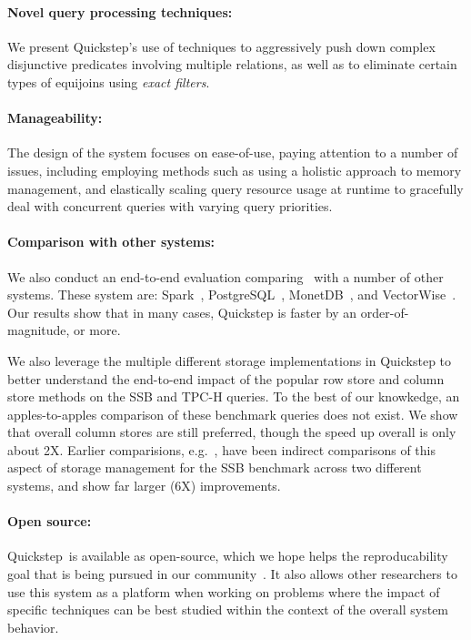 \paragraph{Novel query processing techniques:} We present Quickstep's use of techniques to aggressively push down complex disjunctive predicates involving multiple relations, as well as to eliminate certain types of equijoins using \textit{exact filters}.

\paragraph{Manageability:} The design of the system focuses on ease-of-use, paying attention to a number of issues, including employing methods such as using a holistic approach to memory management, and elastically scaling query resource usage at runtime to gracefully deal with concurrent queries with varying query priorities.

\paragraph{Comparison with other systems:} We also conduct an end-to-end evaluation comparing \Quickstep\ with a number of other systems. These system are: Spark~\cite{Spark, SparkSQL}, PostgreSQL~\cite{postgres}, MonetDB~\cite{monetdb}, and VectorWise~\cite{vectorwise}. Our results show that in many cases, Quickstep is faster by an order-of-magnitude, or more.

We also leverage the multiple different storage implementations in Quickstep to better understand the end-to-end impact of the popular row store and column store methods on the SSB and TPC-H queries. To the best of our knowkedge, an apples-to-apples comparison of these benchmark queries does not exist. We show that overall column stores are still preferred, though the speed up overall is only about 2X. Earlier comparisions, e.g.~\cite{AbadiMH08}, have been indirect comparisons of this aspect of storage management for the SSB benchmark across two different systems, and show far larger (6X) improvements. %

\paragraph{Open source:} Quickstep\ is available as open-source, which we hope helps the reproducability goal that is being pursued in our community~\cite{BonnetMBCGGHIIJKKMOPRTYFS11, ManegoldMAFGHHKKLLORSSWS09, ManolescuAADMPSSZS08}. It also allows other researchers to use this system as a platform when working on  problems where the impact of specific techniques can be best studied within the context of the overall system behavior.

